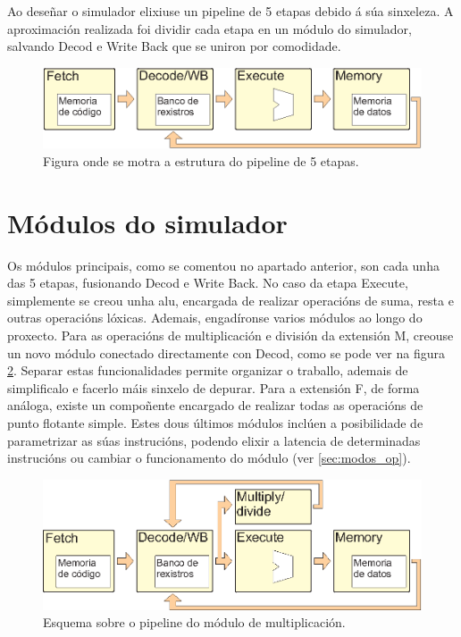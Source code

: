 Ao deseñar o simulador elixiuse un pipeline de 5 etapas debido á súa sinxeleza. A aproximación realizada foi dividir cada etapa en un módulo do simulador, salvando Decod e Write Back que se uniron por comodidade.

\begin{figure}[hp!]
  \centering
  \includegraphics[width=\textwidth]{imaxes/pipeline5etapas.EPS}
  \caption{Figura onde se motra a estrutura do pipeline de 5 etapas.}
  \label{fig:pipeline5etapas}
\end{figure}

\section{Módulos do simulador}\label{sec:modulo_sim}
Os módulos principais, como se comentou no apartado anterior, son cada unha das 5 etapas, fusionando Decod e Write Back. No caso da etapa Execute, simplemente se creou unha \acrshort{alu}, encargada de realizar operacións de suma, resta e outras operacións lóxicas. Ademais, engadíronse varios módulos ao longo do proxecto. Para as operacións de multiplicación e división da extensión M, creouse un novo módulo conectado directamente con Decod, como se pode ver na figura \ref{fig:pipelineMult}. Separar estas funcionalidades permite organizar o traballo, ademais de simplificalo e facerlo máis sinxelo de depurar. Para a extensión F, de forma análoga, existe un compoñente encargado de realizar todas as operacións de punto flotante simple. Estes dous últimos módulos inclúen a posibilidade de parametrizar as súas instrucións, podendo elixir a latencia de determinadas instrucións ou cambiar o funcionamento do módulo (ver \ref{sec:modos_op}).

\begin{figure}[hp!]
  \centering
  \includegraphics[width=\textwidth]{imaxes/pipelineMult.EPS}
  \caption{Esquema sobre o pipeline do módulo de multiplicación.}
  \label{fig:pipelineMult}
\end{figure}


